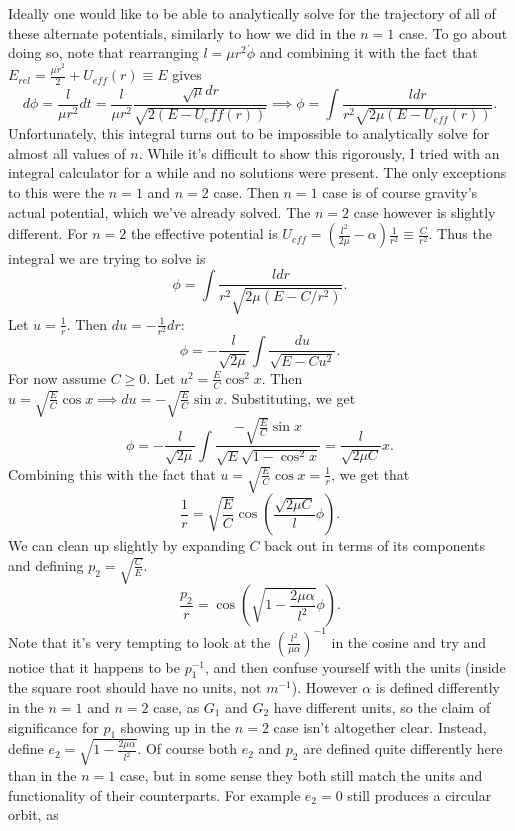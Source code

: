 \documentclass[letterpaper, reqno,11pt]{article}
\begin{document}
Ideally one would like to be able to analytically solve for the trajectory of all of these alternate potentials, similarly to how we did in the $n=1$ case. To go about doing so, note that rearranging $l=\mu r^2\dot\phi$ and combining it with the fact that $E_{rel}=\frac{\mu \dot r^2}{2} +U_{eff}(r)\equiv E$ gives 
\[
d\phi=\frac{l}{\mu r^2}dt=\frac{l}{\mu r^2}\frac{\sqrt{\mu}dr }{\sqrt{ 2(E-U_eff(r))}}\implies\phi=\int \frac{ldr}{r^2\sqrt{2\mu\left( E-U_{eff}(r) \right) } }
.\]
Unfortunately, this integral turns out to be impossible to analytically solve for almost all values of $n$. While it's difficult to show this rigorously, I tried with an integral calculator for a while and no solutions were present. The only exceptions to this were the $n=1$ and $n=2$ case. Then $n=1$ case is of course gravity's actual potential, which we've already solved. The $n=2$ case however is slightly different. For $n=2$ the effective potential is $U_{eff}=\left( \frac{l^2}{2\mu}-\alpha \right)\frac{1}{r^2}\equiv \frac{C}{r^2}$. Thus the integral we are trying to solve is 
\[
\phi=\int \frac{ldr}{r^2\sqrt{2\mu\left( E-C /r^2 \right) } }
.\]
Let $u=\frac{1}{r}$. Then $du=-\frac{1}{r^2} dr$: 
\[
\phi = -\frac{l}{\sqrt{2\mu} }\int \frac{du}{\sqrt{E-Cu^2} }
.\]
For now assume $C\geq0$. Let $u^2=\frac{E}{C}\cos^2 x$. Then $u=\sqrt{\frac{E}{C}}\cos x\implies du=-\sqrt{\frac{E}{C}}\sin x$. Substituting, we get
\[
\phi=-\frac{l}{\sqrt{2\mu} }\int \frac{-\sqrt{\frac{E}{C}}\sin x }{\sqrt{E} \sqrt{1-\cos^2x} }=\frac{l}{\sqrt{2\mu C}}x
.\]
Combining this with the fact that $u=\sqrt{\frac{E}{C}}\cos x=\frac{1}{r}$, we get that
\[
\frac{1}{r}=\sqrt{\frac{E}{C}}\cos\left( \frac{\sqrt{2\mu C}}{l}\phi  \right)  
.\]
We can clean up slightly by expanding $C$ back out in terms of its components and defining $p_2=\sqrt{\frac{C}{E}} $. 
\[
\frac{p_2}{r}=\cos\left( \sqrt{1- \frac{2\mu\alpha}{l^2}} \phi \right) 
.\]
Note that it's very tempting to look at the $\left( \frac{l^2}{\mu\alpha} \right)^{-1} $ in the cosine and try and notice that it happens to be $p_1^{-1}$, and then confuse yourself with the units (inside the square root should have no units, not $m^{-1}$). However $\alpha$ is defined differently in the $n=1$ and $n=2$ case, as $G_1$ and $G_2$ have different units, so the claim of significance for $ p_1$ showing up in the $n=2$ case isn't altogether clear. Instead, define $e_2=\sqrt{1-\frac{2\mu\alpha}{l^2}}  $. Of course both $e_2$ and $p_2$ are defined quite differently here than in the $n=1$ case, but in some sense they both still match the units and functionality of their counterparts. For example $e_2=0$ still produces a circular orbit, as 
\end{document}
